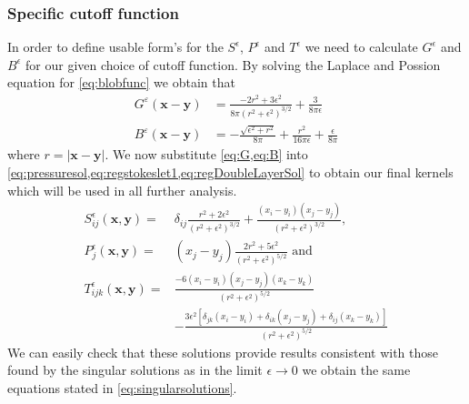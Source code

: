 \subsubsection{Specific cutoff function}
In order to define usable form's for the $S^\epsilon$, $P^\epsilon$ and $T^\epsilon$ we need to calculate $G^\epsilon$ and $B^\epsilon$ for our given choice of cutoff function. By solving the Laplace and Possion equation for \cref{eq:blobfunc} we obtain that 
\begin{subequations}
\begin{align}
    G^\varepsilon(\bm{x}-\bm{y}) &= \frac{-2r^2+3\epsilon^2}{8\pi(r^2+\epsilon^2)^{3/2}} + \frac{3}{8\pi\epsilon} \label{eq:G}\\
    B^\varepsilon(\bm{x}-\bm{y}) &= -\frac{\sqrt{\epsilon^2+r^2}}{8\pi} + \frac{r^2}{16\pi\epsilon} + \frac{\epsilon}{8\pi}\label{eq:B}
\end{align}
\end{subequations}
where $r=|\bm{x}-\bm{y}|$. We now substitute \cref{eq:G,eq:B} into \cref{eq:pressuresol,eq:regstokeslet1,eq:regDoubleLayerSol} to obtain our final kernels which will be used in all further analysis.
\begin{subequations}
\begin{align}
    S_{ij}^\epsilon(\bm{x}, \bm{y}) =& \delta_{ij} \frac{r^2+2\epsilon^2}{\left( r^2 + \epsilon^2 \right)^{3/2}} + \frac{(x_i-y_{i})(x_j-y_{j})}{\left( r^2 + \epsilon^2 \right)^{3/2}}, \label{eq:regstokeslet2} \\
    P_j^\epsilon(\bm{x}, \bm{y}) =& (x_j-y_{j})\frac{2r^2+5\epsilon^2}{(r^2+\epsilon^2)^{5/2}} \text{ and } \label{eq:pressuresol2} \\
    T_{ijk}^\epsilon(\bm{x}, \bm{y}) =& \frac{-6(x_i-y_{i})(x_j-y_{j})(x_k-y_{k})}{(r^2+\epsilon^2)^{5/2}} \label{eq:doublelayer2}\\
    &-\frac{3\epsilon^2[\delta_{jk}(x_i-y_{i}) +\delta_{ik}(x_j-y_{j})+\delta_{ij}(x_k-y_{k})]}{(r^2+\epsilon^2)^{5/2}} \nonumber
\end{align}
\end{subequations}
We can easily check that these solutions provide results consistent with those found by the singular solutions as in the limit $\epsilon \to 0$ we obtain the same equations stated in \cref{eq:singularsolutions}.

